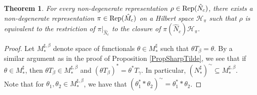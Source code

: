 \documentclass[11pt]{article}
\numberwithin{equation}{section}
\newtheorem{thm}{Theorem}[section]
\theoremstyle{definition}
\newcommand{\Rep}{\text{\rm Rep}}
\newcommand{\cHil}{\mathcal{H}}
\begin{document}
\begin{thm}\label{ThmCorrespondenceC}
For every non-degenerate representation $\rho \in \Rep(\hat{N}_c)$, there exists a non-degenerate representation $\pi \in \Rep(\hat{M}_c)$ on a Hilbert space $\cHil_\pi$ such that $\rho$ is equivalent to the restriction of $\pi\vert_{\hat{N}_c}$ to the closure of $\pi(\hat{N}_c) \cHil_{\pi}$.
\end{thm}
  \begin{proof}
Let $M_\ast^{\sharp,\beta}$ denote space of functionals $\theta \in M_\ast^\sharp$ such that $\theta T_\beta = \theta$. By a similar argument as in the proof of Proposition \ref{PropSharpTilde}, we see that if $\theta \in M_\ast^\sharp$, then $\theta T_\beta \in M_\ast^{\sharp, \beta}$ and $(\theta T_\beta)^\ast = \theta^\ast T_\gamma$.  In particular, $(N_\ast^\sharp)^\sim \subseteq M_\ast^{\sharp,\beta}$. Note that for $\theta_1, \theta_2 \in  M_\ast^{\sharp, \beta}$, we have that $(\theta_1^\ast \ast \theta_2)^\sim = \theta_1^\ast \ast \theta_2$.



\end{proof}
\end{document}
